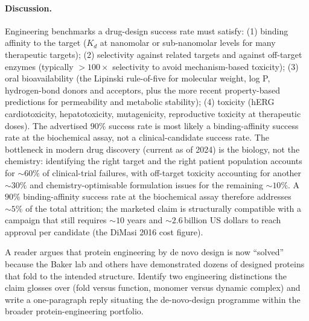 \paragraph{Discussion.}
Engineering benchmarks a drug-design success rate must satisfy: (1)
binding affinity to the target ($K_d$ at nanomolar or sub-nanomolar
levels for many therapeutic targets); (2) selectivity against
related targets and against off-target enzymes (typically $> 100\times$
selectivity to avoid mechanism-based toxicity); (3) oral
bioavailability (the Lipinski rule-of-five for molecular weight, log
P, hydrogen-bond donors and acceptors, plus the more recent
property-based predictions for permeability and metabolic stability);
(4) toxicity (hERG cardiotoxicity, hepatotoxicity, mutagenicity,
reproductive toxicity at therapeutic doses). The advertised $90\%$
success rate is most likely a binding-affinity success rate at the
biochemical assay, not a clinical-candidate success rate. The
bottleneck in modern drug discovery (current as of 2024) is the
biology, not the chemistry: identifying the right target and the
right patient population accounts for $\sim 60\%$ of clinical-trial
failures, with off-target toxicity accounting for another $\sim 30\%$
and chemistry-optimisable formulation issues for the remaining
$\sim 10\%$. A $90\%$ binding-affinity success rate at the
biochemical assay therefore addresses $\sim 5\%$ of the total
attrition; the marketed claim is structurally compatible with a
campaign that still requires $\sim 10$ years and $\sim 2.6\,$billion
US dollars to reach approval per candidate (the DiMasi 2016 cost
figure).

\begin{exercise}
A reader argues that protein engineering by de novo design is now
``solved'' because the Baker lab and others have demonstrated dozens
of designed proteins that fold to the intended structure. Identify
two engineering distinctions the claim glosses over (fold versus
function, monomer versus dynamic complex) and write a one-paragraph
reply situating the de-novo-design programme within the broader
protein-engineering portfolio.
\end{exercise}

